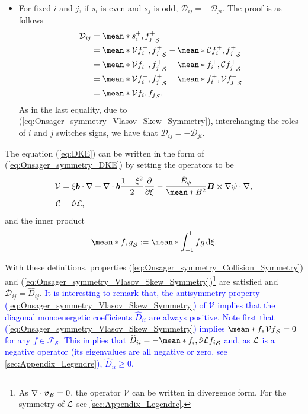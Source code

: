 \begin{itemize}
	\item For fixed $i$ and $j$, if $s_i$ is even and $s_j$ is odd, $\mathcal{D}_{ij} = -\mathcal{D}_{ji}$. The proof is as follows 
	\begin{align*}
		\mathcal{D}_{ij} & = \mean*{s_i^+, f_j^+}_{\mathcal{S}} \\
		& 
		= \mean*{\mathcal{V} f_i^-, f_j^+}_{\mathcal{S}}
		- \mean*{\mathcal{C} f_i^+, f_j^+}_{\mathcal{S}} \\
		& 
		= \mean*{\mathcal{V} f_i^-, f_j^+}_{\mathcal{S}}
		- \mean*{f_i^+, \mathcal{C}  f_j^+}_{\mathcal{S}} \\
		& 
		= \mean*{\mathcal{V} f_i^-, f_j^+}_{\mathcal{S}}
		- \mean*{f_i^+, \mathcal{V}  f_j^-}_{\mathcal{S}} \\
		& 
		= \mean*{\mathcal{V} f_i, f_j}_{\mathcal{S}}.
	\end{align*}
    As in the last equality, due to (\ref{eq:Onsager_symmetry_Vlasov_Skew_Symmetry}), interchanging the roles of $i$ and $j$ switches signs, we have that $\mathcal{D}_{ij} = -\mathcal{D}_{ji}$.

\end{itemize}

The equation (\ref{eq:DKE}) can be written in the form of (\ref{eq:Onsager_symmetry_DKE}) by setting
the operators to be
%
\begin{align}
	\mathcal{V} & = \xi \vb*{b}\cdot \nabla + \nabla\cdot\vb*{b} \frac{1-\xi^2}{2}\pdv{\xi}
	-  \frac{\hat{E}_\psi}{\mean*{B^2}} \vb*{B}\times \nabla \psi \cdot \nabla,
	\\ 
	\mathcal{C} & = \hat{\nu} \Lorentz,
\end{align}
and the inner product
%
\begin{align}
	\mean*{f,g}_{\mathcal{S}}:= \mean*{\int_{-1}^{1}fg\dd{\xi}}.
	\label{eq:Onsager_Inner_Product}
\end{align}

With these definitions, properties (\ref{eq:Onsager_symmetry_Collision_Symmetry}) and (\ref{eq:Onsager_symmetry_Vlasov_Skew_Symmetry})\footnote{As $\nabla \cdot \vb*{v}_E =0$, the operator $\mathcal{V}$ can be written in divergence form. For the symmetry of $\mathcal{L}$ see \ref{sec:Appendix_Legendre}.} are satisfied and $\mathcal{D}_{ij} = \widehat{D}_{ij} $. \textcolor{blue}{It is interesting to remark that, the antisymmetry property (\ref{eq:Onsager_symmetry_Vlasov_Skew_Symmetry}) of $\mathcal{V}$ implies that the diagonal monoenergetic coefficients $\widehat{D}_{ii} $ are always positive. Note first that (\ref{eq:Onsager_symmetry_Vlasov_Skew_Symmetry}) implies $\mean*{f, \mathcal{V} f}_{\mathcal{S}} = 0$ for any $f\in \mathcal{F}_{\mathcal{S}}$. This implies that $\widehat{D}_{ii} = - \mean*{f_i, \hat{\nu}\Lorentz f_i}_{\mathcal{S}} $ and, as $\mathcal{L}$ is a negative operator (its eigenvalues are all negative or zero, see \ref{sec:Appendix_Legendre}), $\widehat{D}_{ii} \ge 0$.}

